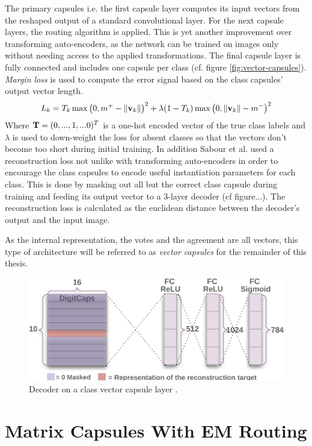 The primary capsules i.e. the first capsule layer computes its input vectors from the reshaped output of a standard convolutional layer. For the next capsule layers, the routing algorithm is applied. This is yet another improvement over transforming auto-encoders, as the network can be trained on images only without needing access to the applied transformations. The final capsule layer is fully connected and includes one capsule per class (cf. figure \ref{fig:vector-capsules}). \emph{Margin loss} is used to compute the error signal based on the class capsules' output vector length.
\begin{align}
    L_k = T_k \operatorname{max}\qty(0,m^+ - \norm{\vb{v}_k})^2 + \lambda \qty(1-T_k) \operatorname{max}\qty(0, \norm{\vb{v}_k}-m^-)^2
\end{align}
Where $\vb{T} = (0,...,1,...0)^T$ is a one-hot encoded vector of the true class labels and $\lambda$ is used to down-weight the loss for absent classes so that the vectors don't become too short during initial training. In addition Sabour et al. used a reconstruction loss not unlike with transforming auto-encoders in order to encourage the class capsules to encode useful instantiation parameters for each class. This is done by masking out all but the correct class capsule during training and feeding its output vector to a 3-layer decoder (cf figure...). The reconstruction loss is calculated as the euclidean distance between the decoder's output and the input image.

As the internal representation, the votes and the agreement are all vectors, this type of architecture will be referred to as \emph{vector capsules} for the remainder of this thesis.
\begin{figure}
    \centering
    \includegraphics[width=\textwidth]{figures/vector-capsules-reconstr.png}
\caption[Decoder on a class vector capsule layer]{Decoder on a class vector capsule layer \cite{sabour2017dynamic}.}\label{fig:vector-capsules-reconstr}
\end{figure}\noindent
\section{Matrix Capsules With EM Routing}